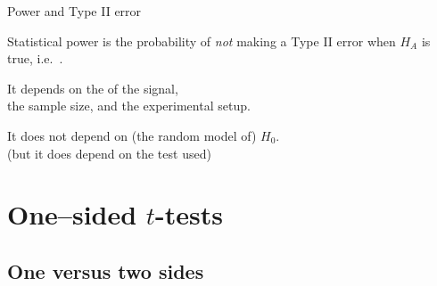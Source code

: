 \begin{frame}{Power and Type II error}

    \begin{block}{}
        \alert{Statistical power} is the probability of \emph{not} making a Type II error when $H_A$ is true,
        i.e.\ .
    \end{block}
    

    \vspace{2em}

    It depends on the  of the signal,\\
    the sample size, and the experimental setup.


    \vspace{2em}

    It does \alert{not} depend on (the random model of) $H_0$.\\
    (but it does depend on the test used)

\end{frame}



\section{One--sided $t$-tests}

\subsection{One versus two sides}


